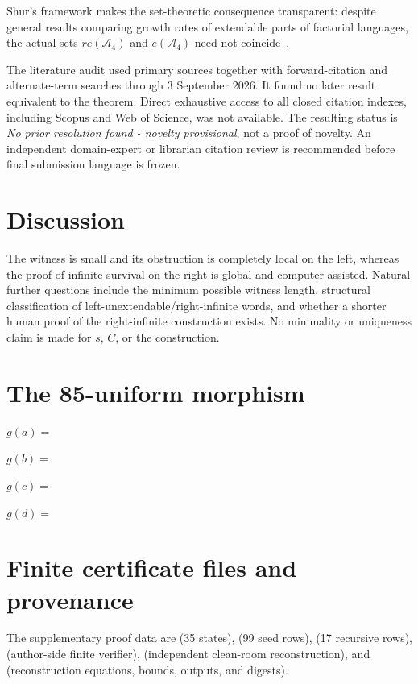 \documentclass[11pt]{article}
\theoremstyle{definition}
\newcommand{\A}{\mathcal A_4}
\begin{document}
Shur's framework makes the set-theoretic consequence transparent: despite general results comparing growth rates of extendable parts of factorial languages, the actual sets $re(\A)$ and $e(\A)$ need not coincide~\cite{Shur2008}.

The literature audit used primary sources together with forward-citation and alternate-term searches through 3 September 2026. It found no later result equivalent to the theorem. Direct exhaustive access to all closed citation indexes, including Scopus and Web of Science, was not available. The resulting status is \emph{No prior resolution found - novelty provisional}, not a proof of novelty. An independent domain-expert or librarian citation review is recommended before final submission language is frozen.

\section{Discussion}

The witness is small and its obstruction is completely local on the left, whereas the proof of infinite survival on the right is global and computer-assisted. Natural further questions include the minimum possible witness length, structural classification of left-unextendable/right-infinite words, and whether a shorter human proof of the right-infinite construction exists. No minimality or uniqueness claim is made for $s$, $C$, or the construction.

\appendix
\section{The 85-uniform morphism}\label{app:g85}
\small
\noindent $g(a)=$ \texttt{}\par
\noindent $g(b)=$ \texttt{}\par
\noindent $g(c)=$ \texttt{}\par
\noindent $g(d)=$ \texttt{}\par
\normalsize

\section{Finite certificate files and provenance}
The supplementary proof data are  (35 states),  (99 seed rows),  (17 recursive rows),  (author-side finite verifier),  (independent clean-room reconstruction), and  (reconstruction equations, bounds, outputs, and digests).
\end{document}
